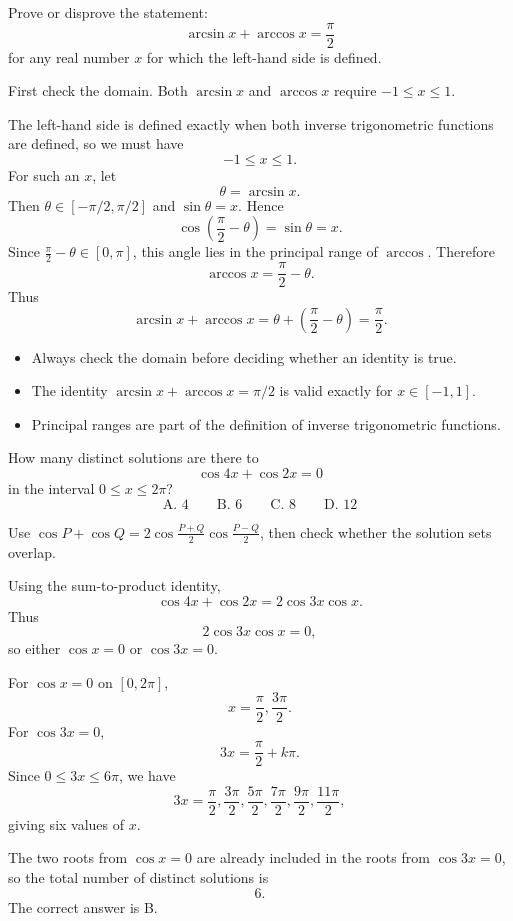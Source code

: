 \begin{problem}
Prove or disprove the statement:
\[
\arcsin x+\arccos x=\frac{\pi}{2}
\]
for any real number $x$ for which the left-hand side is defined.
\end{problem}

\begin{hintbox}
First check the domain. Both $\arcsin x$ and $\arccos x$ require
$-1\le x\le 1$.
\end{hintbox}

\begin{solution}
The left-hand side is defined exactly when both inverse trigonometric functions
are defined, so we must have
\[
-1\le x\le1.
\]
For such an $x$, let
\[
\theta=\arcsin x.
\]
Then $\theta\in[-\pi/2,\pi/2]$ and $\sin\theta=x$. Hence
\[
\cos\left(\frac{\pi}{2}-\theta\right)=\sin\theta=x.
\]
Since $\frac{\pi}{2}-\theta\in[0,\pi]$, this angle lies in the principal range
of $\arccos$. Therefore
\[
\arccos x=\frac{\pi}{2}-\theta.
\]
Thus
\[
\arcsin x+\arccos x
=\theta+\left(\frac{\pi}{2}-\theta\right)
=\frac{\pi}{2}.
\]
\end{solution}

\begin{takeaways}
\begin{itemize}[leftmargin=*]
  \item Always check the domain before deciding whether an identity is true.
  \item The identity $\arcsin x+\arccos x=\pi/2$ is valid exactly for
        $x\in[-1,1]$.
  \item Principal ranges are part of the definition of inverse trigonometric
        functions.
\end{itemize}
\end{takeaways}

\begin{problem}
How many distinct solutions are there to
\[
\cos4x+\cos2x=0
\]
in the interval $0\le x\le2\pi$?
\[
\text{A. }4
\qquad
\text{B. }6
\qquad
\text{C. }8
\qquad
\text{D. }12
\]
\end{problem}

\begin{hintbox}
Use $\cos P+\cos Q=2\cos\frac{P+Q}{2}\cos\frac{P-Q}{2}$, then check whether
the solution sets overlap.
\end{hintbox}

\begin{solution}
Using the sum-to-product identity,
\[
\cos4x+\cos2x
=2\cos3x\cos x.
\]
Thus
\[
2\cos3x\cos x=0,
\]
so either $\cos x=0$ or $\cos3x=0$.

For $\cos x=0$ on $[0,2\pi]$,
\[
x=\frac{\pi}{2},\frac{3\pi}{2}.
\]
For $\cos3x=0$,
\[
3x=\frac{\pi}{2}+k\pi.
\]
Since $0\le3x\le6\pi$, we have
\[
3x=\frac{\pi}{2},\frac{3\pi}{2},\frac{5\pi}{2},
\frac{7\pi}{2},\frac{9\pi}{2},\frac{11\pi}{2},
\]
giving six values of $x$.

The two roots from $\cos x=0$ are already included in the roots from
$\cos3x=0$, so the total number of distinct solutions is
\[
\boxed{6}.
\]
The correct answer is B.
\end{solution}

